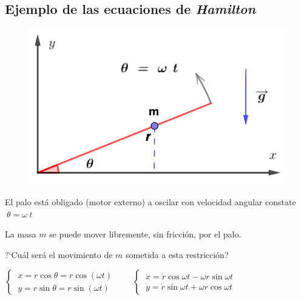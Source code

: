 \vspace{10mm}

\subsection{Ejemplo de las ecuaciones de \emph{Hamilton}}
\vspace{0.5cm}


\begin{example}
	
	\begin{multicols}{2}
	\begin{figure}[H]
	\centering
	\includegraphics[width=.4\textwidth]{imagenes/img13-01.png}
\end{figure}


\vspace{2mm} El palo  está obligado (motor externo) a oscilar con velocidad angular constate $ \ \theta=\omega\ t$

\vspace{2mm} La masa $m$ se puede mover libremente, sin fricción,  por el palo. 

\vspace{2mm} ?`Cuál será el movimiento de $m$ sometida a esta restricción?

\end{multicols}
\end{example}
\vspace{5mm}

$\begin{cases}
\ x=r\cos \theta = r \cos (\omega t)	 \\ \  y=r\sin \theta = r \sin (\omega t)
\end{cases} \qquad 
\begin{cases}
\ \dot x= \dot r \cos \omega t - \omega r \sin \omega t \\ 	
\ \dot y= \dot r \sin \omega t + \omega r \cos \omega t
\end{cases}$

